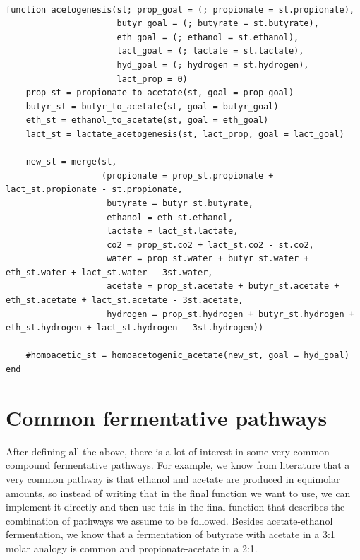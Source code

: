 \documentclass[11pt]{article}
\begin{document}
\begin{verbatim}

function acetogenesis(st; prop_goal = (; propionate = st.propionate),
                      butyr_goal = (; butyrate = st.butyrate),
                      eth_goal = (; ethanol = st.ethanol),
                      lact_goal = (; lactate = st.lactate),
                      hyd_goal = (; hydrogen = st.hydrogen),
                      lact_prop = 0)
    prop_st = propionate_to_acetate(st, goal = prop_goal)
    butyr_st = butyr_to_acetate(st, goal = butyr_goal)
    eth_st = ethanol_to_acetate(st, goal = eth_goal)
    lact_st = lactate_acetogenesis(st, lact_prop, goal = lact_goal)

    new_st = merge(st,
                   (propionate = prop_st.propionate + lact_st.propionate - st.propionate,
                    butyrate = butyr_st.butyrate,
                    ethanol = eth_st.ethanol,
                    lactate = lact_st.lactate,
                    co2 = prop_st.co2 + lact_st.co2 - st.co2,
                    water = prop_st.water + butyr_st.water + eth_st.water + lact_st.water - 3st.water,
                    acetate = prop_st.acetate + butyr_st.acetate + eth_st.acetate + lact_st.acetate - 3st.acetate,
                    hydrogen = prop_st.hydrogen + butyr_st.hydrogen + eth_st.hydrogen + lact_st.hydrogen - 3st.hydrogen))

    #homoacetic_st = homoacetogenic_acetate(new_st, goal = hyd_goal)
end

\end{verbatim}

\section{Common fermentative pathways}
\label{sec:org64c3d17}
After defining all the above, there is a lot of interest in some very common compound fermentative pathways. For example, we know from literature that a very common pathway is that ethanol and acetate are produced in equimolar amounts, so instead of writing that in the final function we want to use, we can implement it directly and then use this in the final function that describes the combination of pathways we assume to be followed. Besides acetate-ethanol fermentation, we know that a fermentation of butyrate with acetate in a 3:1 molar analogy is common and propionate-acetate in a 2:1.
\end{document}
